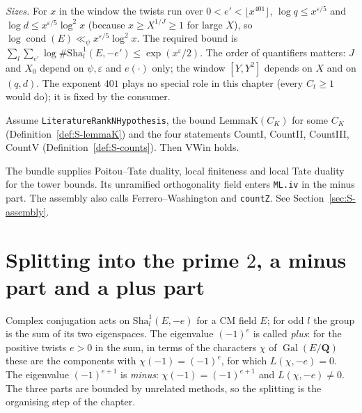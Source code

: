 \noindent\emph{Sizes.} For $x$ in the window the twists run over
$0<e'<\lfloor x^{401}\rfloor$, $\log q\le x^{\varepsilon/5}$ and $\log d\le x^{\varepsilon/5}\log^2x$ (because $x\ge X^{1/J}\ge1$ for large $X$), so
$\log\operatorname{cond}(E)\ll_\psi x^{\varepsilon/5}\log^2 x$. The required bound is
$\sum_l\sum_{e'}\log\#\mathrm{Sha}^1_l(E,-e')\le\exp(x^{\varepsilon}/2)$. The order of quantifiers matters: $J$ and
$X_0$ depend on $\psi,\varepsilon$ and $e(\cdot)$ only; the window $[Y,Y^2]$ depends on $X$ and on $(q,d)$.
The exponent $401$ plays no special role in this chapter (every $C_t\ge1$ would do); it is fixed by the consumer.

\begin{theorem}\label{thm:S-vwin}
Assume \texttt{LiteratureRankNHypothesis}, the bound $\mathrm{LemmaK}(C_K)$ for some $C_K$ (Definition~\ref{def:S-lemmaK}) and the four
statements \textup{CountI}, \textup{CountII}, \textup{CountIII}, \textup{CountV}
(Definition~\ref{def:S-counts}). Then $\mathrm{VWin}$ holds.
\end{theorem}
\noindent The bundle supplies Poitou--Tate duality, local finiteness and local Tate duality for
the tower bounds. Its unramified orthogonality field enters \texttt{ML.iv} in the minus part.
The assembly also calls Ferrero--Washington and \texttt{countZ}. See Section~\ref{sec:S-assembly}.

\section{Splitting into the prime $2$, a minus part and a plus part}\label{sec:S-parts}

Complex conjugation acts on $\mathrm{Sha}^1_l(E,-e)$ for a CM field $E$; for odd $l$ the group is the sum of
its two eigenspaces. The eigenvalue $(-1)^e$ is called \emph{plus}: for the positive twists $e>0$ in the sum, in terms of the characters $\chi$ of
$\operatorname{Gal}(E/\mathbf{Q})$ these are the components with $\chi(-1)=(-1)^e$, for which $L(\chi,-e)=0$. The eigenvalue
$(-1)^{e+1}$ is \emph{minus}: $\chi(-1)=(-1)^{e+1}$ and $L(\chi,-e)\ne0$. The three parts are bounded by
unrelated methods, so the splitting is the organising step of the chapter.


